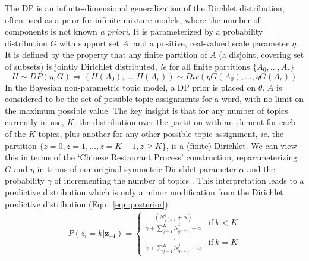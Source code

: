 The DP is an infinite-dimensional generalization of the Dirchlet distribution, often used as a prior for infinite mixture models, where the number of components is not known \emph{a priori}. It is parameterized by a probability distribution $G$ with support set $A$, and a positive, real-valued scale parameter $\eta$. It is defined by the property that any finite partition of $A$ (a disjoint, covering set of subsets) is jointly Dirichlet distributed, \emph{ie} for all finite partitions $\{A_0, \ldots, A_r\}$ \citep{Teh2010}
\begin{equation}
H \sim DP(\eta, G) \Rightarrow (H(A_0), \ldots, H(A_r)) \sim Dir(\eta G(A_0),\ldots,\eta G(A_r))
\end{equation}
In the Bayesian non-parametric topic model, a DP prior is placed on $\theta$. $A$ is considered to be the set of possible topic assignments for a word, with no limit on the maximum possible value. The key insight is that for any number of topics currently in use, $K$, the distribution over the partition with an element for each of the $K$ topics, plus another for any other possible topic assignment, \emph{ie.} the partition $\{z = 0, z = 1, \ldots, z = K - 1, z \geq K\}$, is a (finite) Dirichlet. We can view this in terms of the `Chinese Restaurant Process' construction, reparameterizing $G$ and $\eta$ in terms of our original symmetric Dirichlet parameter $\alpha$ and the probability $\gamma$ of incrementing the number of topics \citep{jordan2005}. This interpretation leads to a predictive distribution which is only a minor modification from the Dirichlet predictive distribution (Eqn.~\ref{eqn:posterior}):
\begin{equation}
\begin{aligned}
P(z_i = k | \boldsymbol{z_{-i}}) =
\begin{cases}
\frac{(N^k_{g(x)} + \alpha)}{\gamma + \sum_{j=1}^K N^j_{g(x)} + \alpha} & \mathrm{if}~k < K\\
\frac{\gamma}{\gamma + \sum_{j=1}^K N^j_{g(x)} + \alpha} & \mathrm{if}~k = K
\end{cases}
\end{aligned}
\end{equation}

